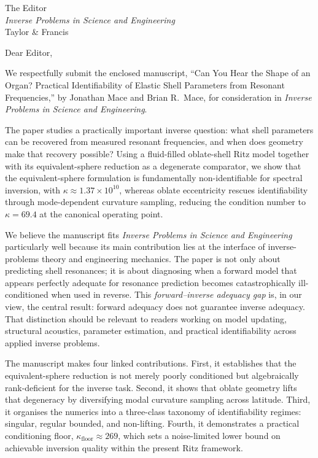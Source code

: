 \documentclass[11pt]{letter}
\date{\today}
\begin{document}
\begin{letter}{%
  The Editor\\
  \textit{Inverse Problems in Science and Engineering}\\
  Taylor \& Francis}

\opening{Dear Editor,}

We respectfully submit the enclosed manuscript, ``Can You Hear the Shape of an
Organ? Practical Identifiability of Elastic Shell Parameters from Resonant
Frequencies,'' by Jonathan Mace and Brian R.\ Mace, for consideration in
\textit{Inverse Problems in Science and Engineering}.

The paper studies a practically important inverse question: what shell
parameters can be recovered from measured resonant frequencies, and when does
geometry make that recovery possible?  Using a fluid-filled oblate-shell Ritz
model together with its equivalent-sphere reduction as a degenerate comparator,
we show that the equivalent-sphere formulation is fundamentally
non-identifiable for spectral inversion, with
$\kappa \approx 1.37 \times 10^{10}$, whereas oblate eccentricity rescues
identifiability through mode-dependent curvature sampling, reducing the
condition number to $\kappa = 69.4$ at the canonical operating point.

We believe the manuscript fits \textit{Inverse Problems in Science and
Engineering} particularly well because its main contribution lies at the
interface of inverse-problems theory and engineering mechanics.  The paper is
not only about predicting shell resonances; it is about diagnosing when a
forward model that appears perfectly adequate for resonance prediction becomes
catastrophically ill-conditioned when used in reverse.  This
\emph{forward--inverse adequacy gap} is, in our view, the central result:
forward adequacy does not guarantee inverse adequacy.  That distinction should
be relevant to readers working on model updating, structural acoustics,
parameter estimation, and practical identifiability across applied inverse
problems.

The manuscript makes four linked contributions.  First, it establishes that the
equivalent-sphere reduction is not merely poorly conditioned but algebraically
rank-deficient for the inverse task.  Second, it shows that oblate geometry
lifts that degeneracy by diversifying modal curvature sampling across latitude.
Third, it organises the numerics into a three-class taxonomy of identifiability
regimes: singular, regular bounded, and non-lifting.  Fourth, it demonstrates a
practical conditioning floor, $\kappa_{\mathrm{floor}} \approx 269$, which sets
a noise-limited lower bound on achievable inversion quality within the present
Ritz framework.


\end{letter}
\end{document}
